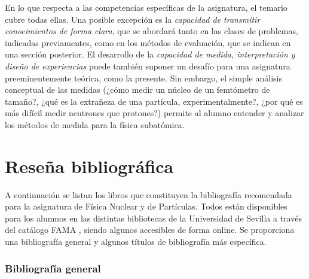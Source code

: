 \documentclass[a4paper,12pt,twoside]{article}
\begin{document}
En lo que respecta a las competencias específicas de la asignatura, el temario cubre todas ellas. Una posible excepción es la \textit{capacidad de transmitir conocimientos de forma clara}, que se abordará tanto en las clases de problemas, indicadas previamentes, como en los métodos de evaluación, que se indican en una sección posterior. El desarrollo de la \textit{capacidad de medida, interpretación y diseño de experiencias} puede también suponer un desafío para una asignatura preeminentemente teórica, como la presente. Sin embargo, el simple análisis conceptual de las medidas (¿cómo medir un núcleo de un femtómetro de tamaño?, ¿qué es la extrañeza de una partícula, experimentalmente?, ¿por qué es más difícil medir neutrones que protones?) permite al alumno entender y analizar los métodos de medida para la física subatómica.

\section{Reseña bibliográfica}
A continuación se listan los libros que constituyen la bibliografía recomendada para la asignatura de Física Nuclear y de Partículas. Todos están disponibles para los alumnos en las distintas bibliotecas de la Universidad de Sevilla a través del catálogo FAMA \cite{fama}, siendo algunos accesibles de forma online. Se proporciona una bibliografía general y algunos títulos de bibliografía más específica.

\subsubsection*{Bibliografía general}
\end{document}
